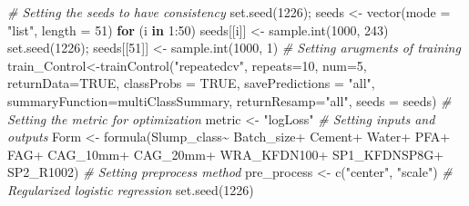 \documentclass[
]{article}
\newenvironment{Shaded}{\begin{snugshade}}{\end{snugshade}}
\newcommand{\AttributeTok}[1]{\textcolor[rgb]{0.77,0.63,0.00}{#1}}
\newcommand{\CommentTok}[1]{\textcolor[rgb]{0.56,0.35,0.01}{\textit{#1}}}
\newcommand{\ConstantTok}[1]{\textcolor[rgb]{0.00,0.00,0.00}{#1}}
\newcommand{\ControlFlowTok}[1]{\textcolor[rgb]{0.13,0.29,0.53}{\textbf{#1}}}
\newcommand{\DecValTok}[1]{\textcolor[rgb]{0.00,0.00,0.81}{#1}}
\newcommand{\FunctionTok}[1]{\textcolor[rgb]{0.00,0.00,0.00}{#1}}
\newcommand{\NormalTok}[1]{#1}
\newcommand{\OtherTok}[1]{\textcolor[rgb]{0.56,0.35,0.01}{#1}}
\newcommand{\SpecialCharTok}[1]{\textcolor[rgb]{0.00,0.00,0.00}{#1}}
\newcommand{\StringTok}[1]{\textcolor[rgb]{0.31,0.60,0.02}{#1}}
\begin{document}
\begin{Shaded}
\begin{Highlighting}[]
\CommentTok{\# Setting the seeds to have consistency}
\FunctionTok{set.seed}\NormalTok{(}\DecValTok{1226}\NormalTok{); seeds }\OtherTok{\textless{}{-}} \FunctionTok{vector}\NormalTok{(}\AttributeTok{mode =} \StringTok{"list"}\NormalTok{, }\AttributeTok{length =} \DecValTok{51}\NormalTok{)}
\ControlFlowTok{for}\NormalTok{ (i }\ControlFlowTok{in} \DecValTok{1}\SpecialCharTok{:}\DecValTok{50}\NormalTok{) seeds[[i]] }\OtherTok{\textless{}{-}} \FunctionTok{sample.int}\NormalTok{(}\DecValTok{1000}\NormalTok{, }\DecValTok{243}\NormalTok{)}
\FunctionTok{set.seed}\NormalTok{(}\DecValTok{1226}\NormalTok{); seeds[[}\DecValTok{51}\NormalTok{]] }\OtherTok{\textless{}{-}} \FunctionTok{sample.int}\NormalTok{(}\DecValTok{1000}\NormalTok{, }\DecValTok{1}\NormalTok{)}
\CommentTok{\# Setting arugments of training}
\NormalTok{train\_Control}\OtherTok{\textless{}{-}}\FunctionTok{trainControl}\NormalTok{(}\StringTok{"repeatedcv"}\NormalTok{, }\AttributeTok{repeats=}\DecValTok{10}\NormalTok{, }\AttributeTok{num=}\DecValTok{5}\NormalTok{, }\AttributeTok{returnData=}\ConstantTok{TRUE}\NormalTok{,}
                            \AttributeTok{classProbs =} \ConstantTok{TRUE}\NormalTok{,  }\AttributeTok{savePredictions =} \StringTok{"all"}\NormalTok{,}
                            \AttributeTok{summaryFunction=}\NormalTok{multiClassSummary,}
                            \AttributeTok{returnResamp=}\StringTok{"all"}\NormalTok{, }\AttributeTok{seeds =}\NormalTok{ seeds)}
\CommentTok{\# Setting the metric for optimization}
\NormalTok{metric }\OtherTok{\textless{}{-}} \StringTok{"logLoss"}
\CommentTok{\# Setting inputs and outputs}
\NormalTok{Form }\OtherTok{\textless{}{-}} \FunctionTok{formula}\NormalTok{(}\StringTok{\textasciigrave{}}\AttributeTok{Slump\_class}\StringTok{\textasciigrave{}}\SpecialCharTok{\textasciitilde{}}\NormalTok{ Batch\_size}\SpecialCharTok{+}\NormalTok{ Cement}\SpecialCharTok{+}\NormalTok{ Water}\SpecialCharTok{+}\NormalTok{ PFA}\SpecialCharTok{+}\NormalTok{ FAG}\SpecialCharTok{+}\NormalTok{ CAG\_10mm}\SpecialCharTok{+}
\NormalTok{                  CAG\_20mm}\SpecialCharTok{+}\NormalTok{ WRA\_KFDN100}\SpecialCharTok{+}\NormalTok{ SP1\_KFDNSP8G}\SpecialCharTok{+}\NormalTok{ SP2\_R1002)}
\CommentTok{\# Setting preprocess method}
\NormalTok{pre\_process }\OtherTok{\textless{}{-}} \FunctionTok{c}\NormalTok{(}\StringTok{"center"}\NormalTok{, }\StringTok{"scale"}\NormalTok{)}
\CommentTok{\# Regularized logistic regression}
\FunctionTok{set.seed}\NormalTok{(}\DecValTok{1226}\NormalTok{)}

\end{Highlighting}
\end{Shaded}
\end{document}
